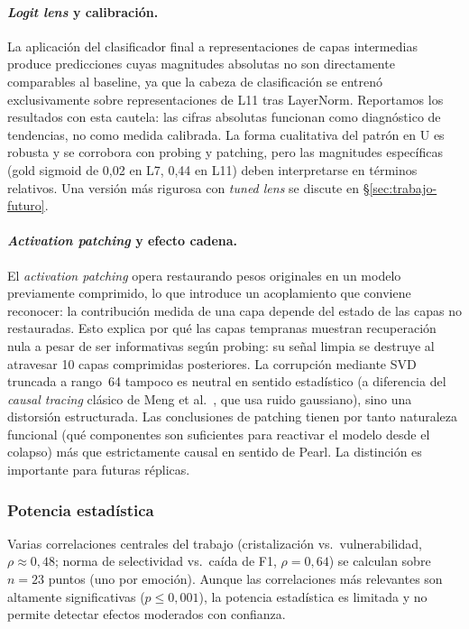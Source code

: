 \paragraph{\emph{Logit lens} y calibración.} La aplicación del clasificador final a
representaciones de capas intermedias produce predicciones cuyas magnitudes
absolutas no son directamente comparables al baseline, ya que la cabeza de
clasificación se entrenó exclusivamente sobre representaciones de L11 tras
LayerNorm. Reportamos los resultados con esta cautela: las cifras absolutas
funcionan como diagnóstico de tendencias, no como medida calibrada. La
forma cualitativa del patrón en U es robusta y se corrobora con probing y
patching, pero las magnitudes específicas (gold sigmoid de 0{,}02 en L7,
0{,}44 en L11) deben interpretarse en términos relativos. Una versión más
rigurosa con \emph{tuned lens} \cite{belrose2023eliciting} se discute en
\S\ref{sec:trabajo-futuro}.

\paragraph{\emph{Activation patching} y efecto cadena.} El \emph{activation patching}
opera restaurando pesos originales en un modelo previamente comprimido, lo
que introduce un acoplamiento que conviene reconocer: la contribución medida
de una capa depende del estado de las capas no restauradas. Esto explica por
qué las capas tempranas muestran recuperación nula a pesar de ser
informativas según probing: su señal limpia se destruye al atravesar 10
capas comprimidas posteriores. La corrupción mediante SVD truncada a
rango~64 tampoco es neutral en sentido estadístico (a diferencia del
\emph{causal tracing} clásico de Meng et al.\ \cite{meng2022locating},
que usa ruido gaussiano), sino una distorsión estructurada. Las
conclusiones de patching tienen por tanto naturaleza funcional (qué
componentes son suficientes para reactivar el modelo desde el colapso)
más que estrictamente causal en sentido de
Pearl. La distinción es importante para futuras réplicas.

\subsubsection{Potencia estadística}

Varias correlaciones centrales del trabajo (cristalización vs.\
vulnerabilidad, $\rho \approx 0{,}48$; norma de selectividad vs.\ caída de
F1, $\rho = 0{,}64$) se calculan sobre $n = 23$ puntos (uno por emoción).
Aunque las correlaciones más relevantes son altamente significativas
($p \leq 0{,}001$), la potencia estadística es limitada y no permite
detectar efectos moderados con confianza.

